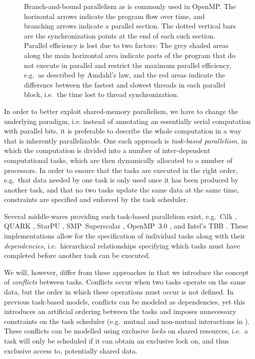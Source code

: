 \documentclass[a4paper,conference]{IEEEtran}
\begin{document}
\begin{figure}
    \centerline{}
    
    \caption{Branch-and-bound parallelism as is commonly used in OpenMP.
        The horizontal arrows indicate the program flow over time, and
        branching arrows indicate a parallel section. The dotted vertical
        bars are the synchronization points at the end of each such section.
        Parallel efficiency is lost due to two factors: The grey shaded areas
        along the main horizontal area indicate parts of the program that
        do not execute in parallel and restrict the maximum parallel
        efficiency, e.g.~as described by Amdahl's law, and the red
        areas indicate the difference between the fastest and slowest
        threads in each parallel block, i.e.~the time lost to
        thread synchronization.
        }
    \label{fig:OMPScaling}
\end{figure}


In order to better exploit shared-memory parallelism, 
we have to change the underlying paradigm, i.e. instead
of annotating an essentially serial computation with parallel
bits, it is preferable to describe the whole computation in a way that
is inherently parallelizable.
One such approach is {\em task-based parallelism}, in which the
computation is divided into a number of inter-dependent
computational tasks, which are then dynamically allocated
to a number of processors.
In order to ensure that the tasks are executed in the right
order, e.g.~that data needed by one task is only used once it
has been produced by another task, and that no two tasks
update the same data at the same time, constraints are specified
and enforced by the task scheduler.

Several middle-wares providing such task-based
parallelism exist, e.g.~Cilk \cite{ref:Blumofe1995}, QUARK \cite{ref:QUARK},
StarPU \cite{ref:Augonnet2011}, SMP~Superscalar \cite{ref:SMPSuperscalar},
OpenMP~3.0 \cite{ref:Duran2009}, and Intel's TBB \cite{ref:Reinders2007}.
These implementations allow for the specification of individual tasks
along with their {\em dependencies}, i.e.~hierarchical relationships
specifying which tasks must have completed before another task
can be executed.

We will, however, differ from these approaches in that we introduce the
concept of {\em conflicts} between tasks.
Conflicts occur when two tasks operate on the same data, 
but the order in which these operations must occur is not defined.
In previous task-based models, conflicts can be modeled as dependencies,
yet this introduces an artificial ordering between the tasks
and imposes unnecessary constraints on the task scheduler
(e.g.~mutual and non-mutual interactions in \cite{ref:Ltaief2012}).
These conflicts can be modelled using exclusive {\em locks} on shared
resources, i.e.~a task will only be scheduled if it can obtain an
exclusive lock on, and thus exclusive access to, potentially shared data.
\end{document}
